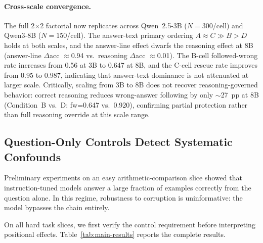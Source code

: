\documentclass{article}
\theoremstyle{definition}
\theoremstyle{definition}
\newcommand{\FSN}{300}
\newcommand{\FSCB}{0.56}
\newcommand{\FSCC}{0.95}
\newcommand{\FSeightN}{150}
\newcommand{\FSeightCB}{0.647}
\newcommand{\FSeightCC}{0.987}
\newcommand{\FSeightCD}{0.920}
\begin{document}
\paragraph{Cross-scale convergence.} The full 2$\times$2 factorial now replicates
across Qwen~2.5-3B ($N{=}\FSN$/cell) and Qwen3-8B ($N{=}\FSeightN$/cell).
The answer-text primary ordering $A{\approx}C \gg B{>}D$ holds at both scales,
and the answer-line effect dwarfs the reasoning effect at 8B
(answer-line $\Delta$acc $\approx$0.94 vs.\ reasoning $\Delta$acc $\approx$0.01).
The B-cell followed-wrong rate increases from \FSCB{} at 3B to \FSeightCB{} at 8B,
and the C-cell rescue rate improves from \FSCC{} to \FSeightCC,
indicating that answer-text dominance is not attenuated at larger scale.
Critically, scaling from 3B to 8B does not recover reasoning-governed behavior:
correct reasoning reduces wrong-answer following by only $\sim$27~pp at 8B
(Condition~B vs.~D: fw=\FSeightCB{} vs.~\FSeightCD), confirming partial
protection rather than full reasoning override at this scale range.



\subsection{Question-Only Controls Detect Systematic Confounds}
\label{sec:controls}

Preliminary experiments on an easy arithmetic-comparison slice showed that
instruction-tuned models answer a large fraction of examples correctly from the
question alone. In this regime, robustness to corruption is uninformative: the
model bypasses the chain entirely.

On all hard task slices, we first verify the control requirement before
interpreting positional effects. Table~\ref{tab:main-results} reports the
complete results.
\end{document}
